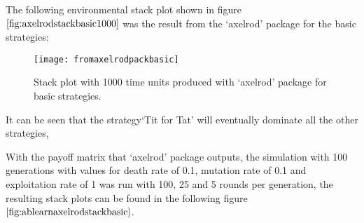 \begin{table}[H]
\begin{center}
\end{center}
\caption{`Axelrod' package payoff bimatrix for basic strategies.}
\label{tab:axelrodbasicmatrix}
\end{table}

The following environmental stack plot shown in figure $\ref{fig:axelrodstackbasic1000}$ was the result from the `axelrod' package for the basic strategies:

\begin{figure}[H]
\begin{center}
	\texttt{[image: fromaxelrodpackbasic]}

\caption{Stack plot with 1000 time units produced with `axelrod' package for basic strategies.}
\label{fig:axelrodstackbasic1000}
\end{center}
\end{figure}
It can be seen that the strategy`Tit for Tat' will eventually dominate all the other strategies, 

With the payoff matrix that `axelrod' package outputs, the simulation with 100 generations with values for death rate of 0.1, mutation rate of 0.1 and exploitation rate of 1 was run with 100, 25 and 5 rounds per generation, the resulting stack plots can be found in the following figure $\ref{fig:ablearnaxelrodstackbasic}$.


